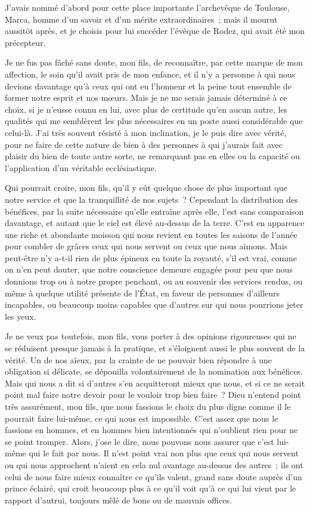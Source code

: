 \documentclass[french,twoside]{book} %
\begin{document}
J’avais nommé d’abord pour cette place importante l’archevêque de Toulouse, Marca, homme d’un savoir et d’un mérite extraordinaires ; mais il mourut aussitôt après, et je choisis pour lui succéder l’évêque de Rodez, qui avait été mon précepteur.\par
Je ne fus pas fâché sans doute, mon fils, de reconnaître, par cette marque de mon affection, le soin qu’il avait pris de mon enfance, et il n’y a personne à qui nous devions davantage qu’à ceux qui ont eu l’honneur et la peine tout ensemble de former notre esprit et nos mœurs. Mais je ne me serais jamais déterminé à ce choix, si je n’eusse connu en lui, avec plus de certitude qu’en aucun autre, les qualités qui me semblèrent les plus nécessaires en un poste aussi considérable que celui-là. J’ai très souvent résisté à mon inclination, je le puis dire avec vérité, pour ne faire de cette nature de bien à des personnes à qui j’aurais fait avec plaisir du bien de toute autre sorte, ne remarquant pas en elles ou la capacité ou l’application d’un véritable ecclésiastique.\par
Qui pourrait croire, mon fils, qu’il y eût quelque chose de plus important que notre service et que la tranquillité de nos sujets ? Cependant la distribution des bénéfices, par la suite nécessaire qu’elle entraîne après elle, l’est sans comparaison davantage, et autant que le ciel est élevé au-dessus de la terre. C’est en apparence une riche et abondante moisson qui nous revient en toutes les saisons de l’année pour combler de grâces ceux qui nous servent ou ceux que nous aimons. Mais peut-être n’y a-t-il rien de plus épineux en toute la royauté, s’il est vrai, comme on n’en peut douter, que notre conscience demeure engagée pour peu que nous donnions trop ou à notre propre penchant, ou au souvenir des services rendus, ou même à quelque utilité présente de l’État, en faveur de personnes d’ailleurs incapables, ou beaucoup moins capables que d’autres sur qui nous pourrions jeter les yeux.\par
Je ne veux pas toutefois, mon fils, vous porter à des opinions rigoureuses qui ne se réduisent presque jamais à la pratique, et s’éloignent aussi le plus souvent de la vérité. Un de nos aïeux, par la crainte de ne pouvoir bien répondre à une obligation si délicate, se dépouilla volontairement de la nomination aux bénéfices. Mais qui nous a dit si d’autres s’en acquitteront mieux que nous, et si ce ne serait point mal faire notre devoir pour le vouloir trop bien faire ? Dieu n’entend point très assurément, mon fils, que nous fassions le choix du plus digne comme il le pourrait faire lui-même, ce qui nous est impossible. C’est assez que nous le fassions en hommes, et en hommes bien intentionnés qui n’oublient rien pour ne se point tromper. Alors, j’ose le dire, nous pouvons nous assurer que c’est lui-même qui le fait par nous. Il n’est point vrai non plus que ceux qui nous servent ou qui nous approchent n’aient en cela nul avantage au-dessus des autres ; ils ont celui de nous faire mieux connaître ce qu’ils valent, grand sans doute auprès d’un prince éclairé, qui croit beaucoup plus à ce qu’il voit qu’à ce qui lui vient par le rapport d’autrui, toujours mêlé de bons ou de mauvais offices.\par
\end{document}
